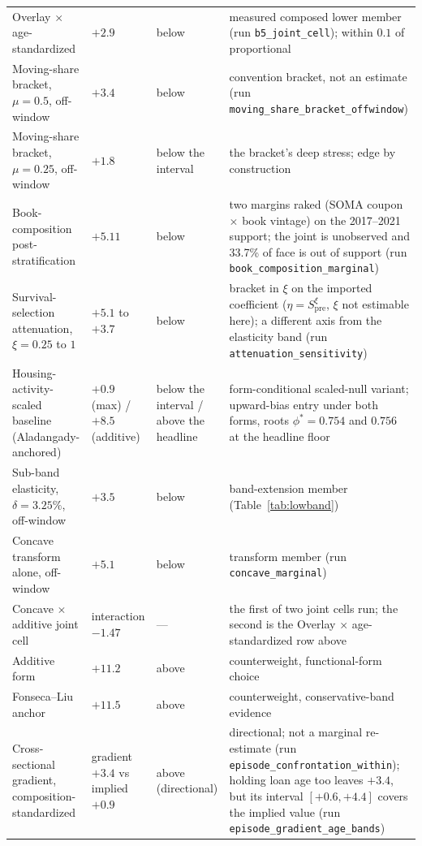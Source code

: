 \documentclass[12pt]{article}
\begin{document}
{\begin{longtable}{@{}p{3.1cm}p{2.6cm}p{2.4cm}p{7.1cm}@{}}
Overlay $\times$ age-standardized & $+2.9$ & below & measured composed lower member (run \texttt{b5\_joint\_cell}); within $0.1$ of proportional \\ Moving-share bracket, $\mu = 0.5$, off-window & $+3.4$ & below & convention bracket, not an estimate (run \texttt{moving\_share\_bracket\_offwindow}) \\ Moving-share bracket, $\mu = 0.25$, off-window & $+1.8$ & below the interval & the bracket's deep stress; edge by construction \\ Book-composition post-stratification & $+5.11$ & below & two margins raked (SOMA coupon $\times$ book vintage) on the 2017--2021 support; the joint is unobserved and 33.7\% of face is out of support (run \texttt{book\_composition\_marginal}) \\ Survival-selection attenuation, $\xi = 0.25$ to $1$ & $+5.1$ to $+3.7$ & below & bracket in $\xi$ on the imported coefficient ($\eta = S_{\mathrm{pre}}^{\xi}$, $\xi$ not estimable here); a different axis from the elasticity band (run \texttt{attenuation\_sensitivity}) \\ Housing-activity-scaled baseline (Aladangady-anchored) & $+0.9$ (max) / $+8.5$ (additive) & below the interval / above the headline & form-conditional scaled-null variant; upward-bias entry under both forms, roots $\phi^{*} = 0.754$ and $0.756$ at the headline floor \\ Sub-band elasticity, $\delta = 3.25\%$, off-window & $+3.5$ & below & band-extension member (Table~\ref{tab:lowband}) \\ Concave transform alone, off-window & $+5.1$ & below & transform member (run \texttt{concave\_marginal}) \\
Concave $\times$ additive joint cell & interaction $-1.47$ & --- & the first of two joint cells run; the second is the Overlay $\times$ age-standardized row above \\
Additive form & $+11.2$ & above & counterweight, functional-form choice \\
Fonseca--Liu anchor & $+11.5$ & above & counterweight, conservative-band evidence \\ Cross-sectional gradient, composition-standardized & gradient $+3.4$ vs implied $+0.9$ & above (directional) & directional; not a marginal re-estimate (run \texttt{episode\_confrontation\_within}); holding loan age too leaves $+3.4$, but its interval $[+0.6, +4.4]$ covers the implied value (run \texttt{episode\_gradient\_age\_bands}) \\
\bottomrule
\end{longtable}
}
\end{document}

